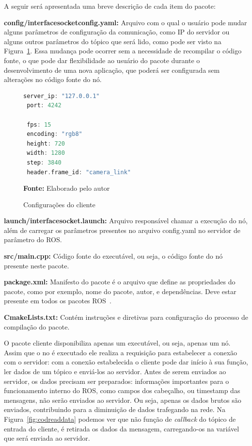 A seguir será apresentada uma breve descrição de cada item do pacote:
 
\textbf{config/interface\underline{\hspace{.07in}}socket\underline{\hspace{.07in}}config.yaml:} Arquivo com o qual o usuário pode mudar alguns parâmetros de configuração da comunicação, como IP do servidor ou alguns outros parâmetros do tópico que será lido, como pode ser visto na Figura~\ref{fig:codigoconfig}. Essa mudança pode ocorrer sem a necessidade de recompilar o código fonte, o que pode dar flexibilidade ao usuário do pacote durante o desenvolvimento de uma nova aplicação, que poderá ser configurada sem alterações no código fonte do nó. 

\begin{figure}[ht]
\caption{Configurações do cliente}
\begin{center}
\begin{lstlisting}[language=C++, backgroundcolor=\color{gray!10}]
 server_ip: "127.0.0.1"
 port: 4242

 fps: 15
 encoding: "rgb8"
 height: 720
 width: 1280
 step: 3840
 header.frame_id: "camera_link"
\end{lstlisting}
{\small \textbf{Fonte:} Elaborado pelo autor}	
\end{center}\label{fig:codigoconfig}
\end{figure}
	

\textbf{launch/interface\underline{\hspace{.07in}}socket.launch:} Arquivo responsável chamar a execução do nó, além de carregar os parâmetros presentes no arquivo config.yaml no servidor de parâmetro do ROS\@.

\textbf{src/main.cpp:} Código fonte do executável, ou seja, o código fonte do nó presente neste pacote.

\textbf{package.xml:} Manifesto do pacote é o arquivo que define as propriedades do pacote, como por exemplo, nome do pacote, autor, e dependências. Deve estar presente em todos os pacotes ROS~\cite{RosPkgXml}.


\textbf{CmakeLists.txt:} Contém instruções e diretivas para configuração do processo de compilação do pacote.

O pacote cliente disponibiliza apenas um executável, ou seja, apenas um nó. Assim que o no é executado ele realiza a requisição para estabelecer a conexão com o servidor: com a conexão estabelecida o cliente pode dar início à sua função, ler dados de um tópico e enviá-los ao servidor. Antes de serem enviados ao servidor, os dados precisam ser preparados: informações importantes para o funcionamento interno do ROS, como campos dos cabeçalho, ou timestamp das mensagens, não serão enviados ao servidor. Ou seja, apenas os dados brutos são enviados, contribuindo para a diminuição de dados trafegando na rede. Na Figura~\ref{fig:codreaddata} podemos ver que não função de \textit{callback} do tópico de entrada do cliente, é retirada os dados da mensagem, carregando-os na variável que será enviada ao servidor.

